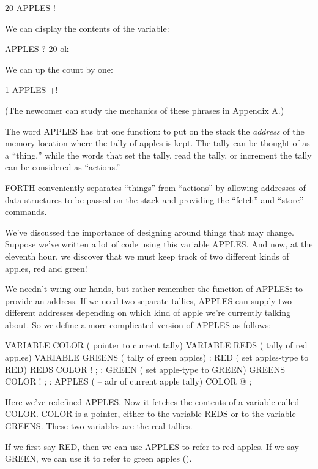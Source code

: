 \begin{Code}
20 APPLES !
\end{Code}
We can display the contents of the variable:

\begin{Code}
APPLES ? 20 ok
\end{Code}
We can up the count by one:

\begin{Code}
1 APPLES +!
\end{Code}
(The newcomer can study the mechanics of these phrases in Appendix
A.)

The word APPLES has but one function: to put on the stack the \emph{address}
of the memory location where the tally of apples is kept. The tally
can be thought of as a {}``thing,'' while the words that set the
tally, read the tally, or increment the tally can be considered as
{}``actions.''

FORTH conveniently separates {}``things'' from {}``actions'' by
allowing addresses of data structures to be passed on the stack and
providing the {}``fetch'' and {}``store'' commands.

We've discussed the importance of designing around things that may
change. Suppose we've written a lot of code using this variable APPLES.
And now, at the eleventh hour, we discover that we must keep track
of two different kinds of apples, red and green!

We needn't wring our hands, but rather remember the function of APPLES:
to provide an address. If we need two separate tallies, APPLES can
supply two different addresses depending on which kind of apple we're
currently talking about. So we define a more complicated version of
APPLES as follows:

\begin{Code}
VARIABLE COLOR  ( pointer to current tally)
VARIABLE REDS  ( tally of red apples)
VARIABLE GREENS  ( tally of green apples)
: RED  ( set apples-type to RED)  REDS COLOR ! ;
: GREEN  ( set apple-type to GREEN)  GREENS COLOR ! ;
: APPLES  ( -- adr of current apple tally)  COLOR @ ;
\end{Code}


Here we've redefined APPLES. Now it fetches the contents of a variable
called COLOR. COLOR is a pointer, either to the variable REDS or to
the variable GREENS. These two variables are the real tallies.

If we first say RED, then we can use APPLES to refer to red apples.
If we say GREEN, we can use it to refer to green apples ().

